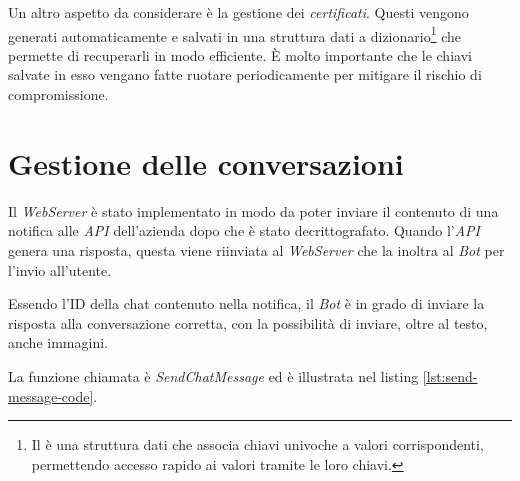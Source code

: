 Un altro aspetto da considerare è la gestione dei \emph{certificati}.
Questi vengono generati automaticamente e salvati in una struttura dati a dizionario\footnote{Il è una struttura dati che associa chiavi univoche a valori corrispondenti, permettendo accesso rapido ai valori tramite le loro chiavi.} che permette di recuperarli in modo efficiente.
È molto importante che le chiavi salvate in esso vengano fatte ruotare periodicamente per mitigare il rischio di compromissione.


\section{Gestione delle conversazioni}

Il \emph{WebServer} è stato implementato in modo da poter inviare il contenuto di una notifica alle \emph{API} dell'azienda dopo che è stato decrittografato.
Quando l'\emph{API} genera una risposta, questa viene riinviata al \emph{WebServer} che la inoltra al \emph{Bot} per l'invio all'utente.

Essendo l'ID della chat contenuto nella notifica, il \emph{Bot} è in grado di inviare la risposta alla conversazione corretta, con la possibilità di inviare, oltre al testo, anche immagini.

\noindent La funzione chiamata è \emph{SendChatMessage} ed è illustrata nel listing \ref{lst:send-message-code}.

